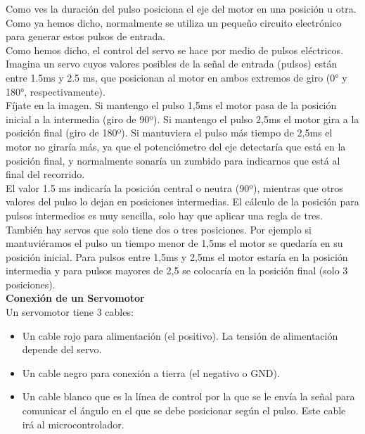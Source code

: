 \documentclass[12pt]{article}
\begin{document}
	\noindent Como ves la duración del pulso posiciona el eje del motor en una posición u otra.\\
	
	\noindent Como ya hemos dicho, normalmente se utiliza un pequeño circuito electrónico para generar estos pulsos de entrada.\\
	
	\noindent Como hemos dicho, el control del servo se hace por medio de pulsos eléctricos. \\
	
	\noindent Imagina un servo cuyos valores posibles de la señal de entrada (pulsos) están entre 1.5ms y 2.5 ms, que posicionan al motor en ambos extremos de giro (0° y 180°, respectivamente). \\
	
	\noindent Fíjate en la imagen. Si mantengo el pulso 1,5ms el motor pasa de la posición inicial a la intermedia (giro de 90º). Si mantengo el pulso 2,5ms el motor gira a la posición final (giro de 180º). Si mantuviera el pulso más tiempo de 2,5ms el motor no giraría más, ya que el potenciómetro del eje detectaría que está en la posición final, y normalmente sonaría un zumbido para indicarnos que está al final del recorrido. \\
	
	\noindent El valor 1.5 ms indicaría la posición central o neutra (90º), mientras que otros valores del pulso lo dejan en posiciones intermedias. El cálculo de la posición para pulsos intermedios es muy sencilla, solo hay que aplicar una regla de tres. \\
	
	También hay servos que solo tiene dos o tres posiciones. Por ejemplo si mantuviéramos el pulso un tiempo menor de 1,5ms el motor se quedaría en su posición inicial. Para pulsos entre 1,5ms y 2,5ms el motor estaría en la posición intermedia y para pulsos mayores de 2,5 se colocaría en la posición final (solo 3 posiciones). \\
	
	\noindent \textbf{Conexión de un Servomotor} \\
	
	Un servomotor tiene 3 cables: 
	
	\begin{itemize}
		\item Un cable rojo para alimentación (el positivo). La tensión de alimentación depende del servo.
		\item Un cable negro para conexión a tierra (el negativo o GND).
		\item Un cable blanco que es la línea de control por la que se le envía la señal para comunicar el ángulo en el que se debe posicionar según el pulso. Este cable irá al microcontrolador.
	\end{itemize}
\end{document}
